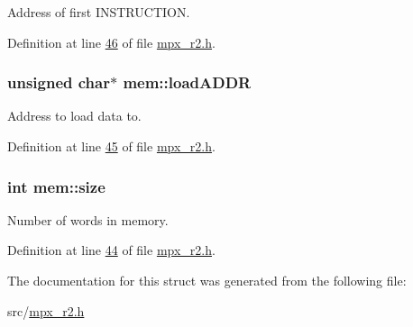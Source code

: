 Address of first INSTRUCTION. 



Definition at line \hyperlink{mpx__r2_8h_source_l00046}{46} of file \hyperlink{mpx__r2_8h_source}{mpx\_\-r2.h}.

\hypertarget{structmem_a8f5a4db03ee0560e6bd4dd602ad753c0}{
\subsubsection[{loadADDR}]{\setlength{\rightskip}{0pt plus 5cm}unsigned char$\ast$ {\bf mem::loadADDR}}}
\label{structmem_a8f5a4db03ee0560e6bd4dd602ad753c0}


Address to load data to. 



Definition at line \hyperlink{mpx__r2_8h_source_l00045}{45} of file \hyperlink{mpx__r2_8h_source}{mpx\_\-r2.h}.

\hypertarget{structmem_a2f6285207fccce5cfe6a24037bd780c3}{
\subsubsection[{size}]{\setlength{\rightskip}{0pt plus 5cm}int {\bf mem::size}}}
\label{structmem_a2f6285207fccce5cfe6a24037bd780c3}


Number of words in memory. 



Definition at line \hyperlink{mpx__r2_8h_source_l00044}{44} of file \hyperlink{mpx__r2_8h_source}{mpx\_\-r2.h}.



The documentation for this struct was generated from the following file:\begin{DoxyCompactItemize}
\item 
src/\hyperlink{mpx__r2_8h}{mpx\_\-r2.h}\end{DoxyCompactItemize}
